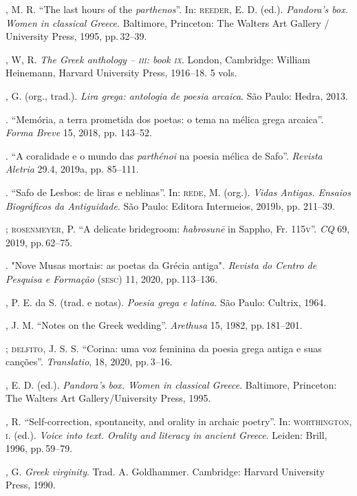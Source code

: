 \begin{bibliohedra}
, M. R. “The last hours of the \textit{parthenos}”. In: \textsc{reeder}, E. D. (ed.). \textit{Pandora’s box. Women in classical Greece}. Baltimore, Princeton: The Walters Art Gallery / University Press, 1995, pp.\,32--39. 

, W, R. \textit{The Greek anthology -- \textsc{iii}: book \textsc{ix}}. London, Cambridge: William Heinemann, Harvard University Press, 1916--18. 5 vols.

, G. (org., trad.). \textit{Lira grega: antologia de poesia arcaica}. São Paulo: Hedra, 2013.

\titidem. “Memória, a terra prometida dos poetas: o tema na mélica grega arcaica”. \textit{Forma Breve} 15, 2018, pp. 143--52. 

\titidem. “A coralidade e o mundo das \textit{parthénoi} na poesia mélica de Safo”. \textit{Revista Aletria} 29.4, 2019a, pp. 85--111. 

\titidem. “Safo de Lesbos: de liras e neblinas”. In: \textsc{rede}, M. (org.). \textit{Vidas Antigas. Ensaios Biográficos da Antiguidade}. São Paulo: Editora Intermeios, 2019b, pp. 211--39.

\titidem; \textsc{rosenmeyer}, P. “A delicate bridegroom: \textit{habrosunē} in Sappho, Fr. 115\textsc{v}”. \textit{CQ} 69, 2019, pp.\,62--75.

\titidem. "Nove Musas mortais: as poetas da Grécia antiga". \textit{Revista do Centro de Pesquisa e Formação} (\textsc{sesc}) 11, 2020, pp.\,113--136.

, P. E. da S. (trad. e notas). \textit{Poesia grega e latina}. São Paulo: Cultrix, 1964.

, J. M. “Notes on the Greek wedding”. \textit{Arethusa} 15, 1982, pp.\,181--201. 

\titidem; \textsc{delfito}, J. S. S. “Corina: uma voz feminina da poesia grega antiga e suas canções”. \textit{Translatio},  18, 2020, pp.\,3--16.

, E. D. (ed.). \textit{Pandora’s box. Women in classical Greece}. Baltimore, Princeton: The Walters Art Gallery/University Press, 1995.


, R. “Self-correction, spontaneity, and orality in archaic poetry”. In: \textsc{worthington}, \textsc{i}. (ed.). \textit{Voice into text. Orality and literacy in ancient Greece}. Leiden: Brill, 1996, pp.\,59--79.

, G. \textit{Greek virginity}. Trad. A. Goldhammer. Cambridge: Harvard University Press, 1990.


\end{bibliohedra}

